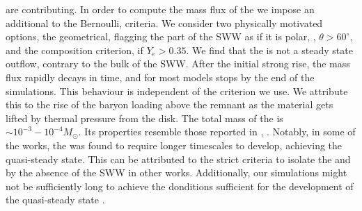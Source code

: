 are contributing. 
%
In order to compute the mass flux of the \nwind{} we impose an additional to the Bernoulli, criteria.
We consider two physically motivated options, the geometrical, flagging the part of the \ac{SWW} 
as \nwind{} if it is polar, \ie, $\theta>60^{\circ}$, and the composition criterion, if $Y_e > 0.35$.
%
We find that the \nwind{} is not a steady state outflow, contrary to the bulk of the \ac{SWW}.
After the initial strong rise, the mass flux rapidly decays in time, and for most models stops 
by the end of the simulations. This behaviour is independent of the criterion we use. 
We attribute this to the rise of the baryon loading above the remnant as the material gets lifted 
by thermal pressure from the disk.
The total mass of the \nwind{} is ${\sim}10^{-3}-10^{-4}M_{\odot}$. Its properties resemble those 
reported in \eg, \citet{Dessart:2008zd,Perego:2014fma,Fujibayashi:2020dvr}.
Notably, in some of the works, the \nwind{} was found to require longer timescales to develop, 
achieving the quasi-steady state. 
This can be attributed to the strict criteria to isolate the \nwind{} and by the absence of the 
\ac{SWW} in other works. 
Additionally, our simulations might not be sufficiently long to achieve the donditions 
sufficient for the development of the quasi-steady state \nwind{}.













